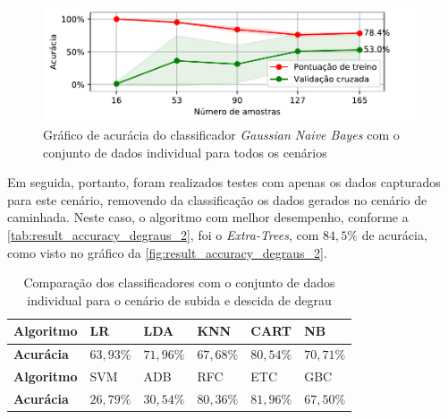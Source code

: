\begin{figure}[ht]
	\caption{\label{fig:result_accuracy_degraus_1}Gráfico de acurácia do classificador \textit{Gaussian Naive Bayes} com o conjunto de dados individual para todos os cenários}
	\begin{center}
		\includegraphics[width=\textwidth]{resources/result_accuracy_degraus_1}
	\end{center}
\end{figure}

\newpage
Em seguida, portanto, foram realizados testes com apenas os dados capturados para este cenário, removendo da classificação os dados gerados no cenário de caminhada. Neste caso, o algoritmo com melhor desempenho, conforme a \autoref{tab:result_accuracy_degraus_2}, foi o \textit{Extra-Trees}, com \(84{,}5\%\) de acurácia, como visto no gráfico da \autoref{fig:result_accuracy_degraus_2}.

\begin{table}[ht]
	\caption{Comparação dos classificadores com o conjunto de dados individual para o cenário de subida e descida de degrau}%
	\label{tab:result_accuracy_degraus_2}
	\begin{tabularx}{\textwidth}{X X X X X X}
		\toprule
		\textbf{Algoritmo} & LR            & LDA           & KNN           & CART          & NB            \\ \midrule
		\textbf{Acurácia}  & \(63{,}93\%\) & \(71{,}96\%\) & \(67{,}68\%\) & \(80{,}54\%\) & \(70{,}71\%\) \\ \bottomrule \toprule
		\textbf{Algoritmo} & SVM           & ADB           & RFC           & ETC           & GBC           \\ \midrule
		\textbf{Acurácia}  & \(26{,}79\%\) & \(30{,}54\%\) & \(80{,}36\%\) & \(81{,}96\%\) & \(67{,}50\%\) \\ \bottomrule
	\end{tabularx}
\end{table}

